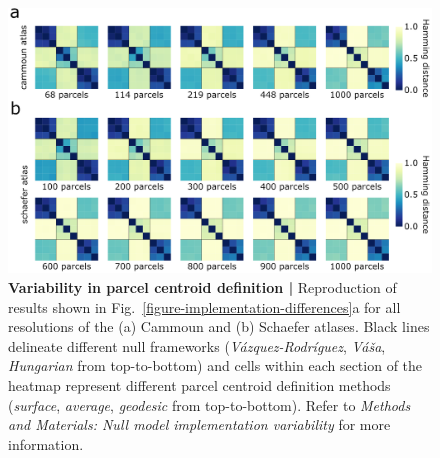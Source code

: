 \documentclass[12pt,aps,pra,reprint,showkeys]{revtex4-1}
\begin{document}
\begin{figure}[htp]
  \begin{center}
    \centerline{\includegraphics[width=\textwidth]{parcel-centroids.png}}
    \caption{
      \textbf{Variability in parcel centroid definition |}
      Reproduction of results shown in Fig.~\ref{figure-implementation-differences}a for all resolutions of the (a) Cammoun and (b) Schaefer atlases.
      Black lines delineate different null frameworks (\textit{V{\'a}zquez-Rodr{\'i}guez}, \textit{V{\'a}{\v{s}}a}, \textit{Hungarian} from top-to-bottom) and cells within each section of the heatmap represent different parcel centroid definition methods (\textit{surface}, \textit{average}, \textit{geodesic} from top-to-bottom).
      Refer to \textit{Methods and Materials: Null model implementation variability} for more information.
    }
    \label{supp-figure-parcel-centroids}
  \end{center}
\end{figure}
\end{document}
